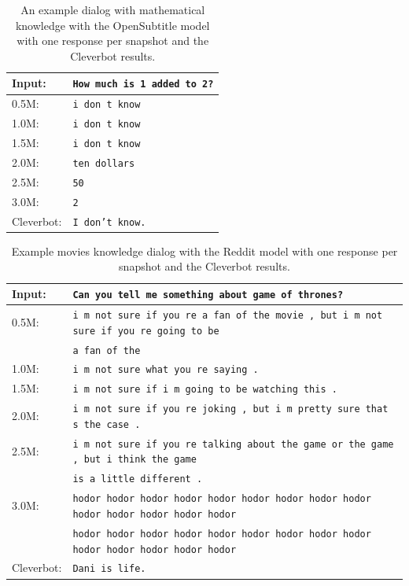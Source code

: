 \begin{table}[H]
	\centering
	\begin{adjustbox}{max width=\textwidth}
		\begin{tabular}{ll}
			\toprule
			Input: 	& \texttt{How much is 1 added to 2?}\\
			\midrule
			0.5M: 	& \texttt{i don t know}\\
			1.0M: 	& \texttt{i don t know}\\
			1.5M:	& \texttt{i don t know}\\
			2.0M:	& \texttt{ten dollars}\\
			2.5M:	& \texttt{50}\\
			3.0M:	& \texttt{2}\\
			Cleverbot:	& \texttt{I don't know.}\\
			\bottomrule
		\end{tabular}
	\end{adjustbox}
	\caption{An example dialog with mathematical knowledge with the OpenSubtitle model with one response per snapshot and the Cleverbot results.}
	\label{results:example5_output:OpenSubtitle_compared}
\end{table}
\begin{table}[H]
	\centering
	\begin{adjustbox}{max width=\textwidth}
		\begin{tabular}{ll}
			\toprule
			Input: 	& \texttt{Can you tell me something about game of thrones?}\\
			\midrule
			0.5M: 	& \texttt{i m not sure if you re a fan of the movie , but i m not sure if you re going to be}\\
			& \texttt{a fan of the}\\
			1.0M: 	& \texttt{i m not sure what you re saying .}\\
			1.5M:	& \texttt{i m not sure if i m going to be watching this .}\\
			2.0M:	& \texttt{i m not sure if you re joking , but i m pretty sure that s the case .}\\
			2.5M:	& \texttt{i m not sure if you re talking about the game or the game , but i think the game}\\
			& \texttt{is a little different .}\\
			3.0M:	& \texttt{hodor hodor hodor hodor hodor hodor hodor hodor hodor hodor hodor hodor hodor hodor }\\
			& \texttt{hodor hodor hodor hodor hodor hodor hodor hodor hodor hodor hodor hodor hodor hodor}\\
			Cleverbot:	& \texttt{Dani is life.}\\
			\bottomrule
		\end{tabular}
	\end{adjustbox}
	\caption{Example movies knowledge dialog with the Reddit model with one response per snapshot and the Cleverbot results.}
	\label{results:example5_output:Reddit_compared}
\end{table}


